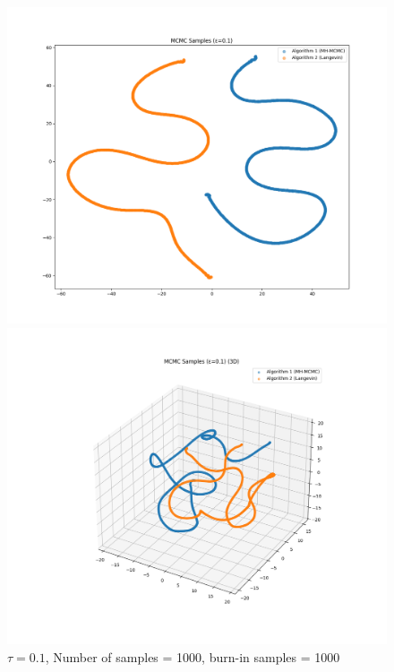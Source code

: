\documentclass[a4paper,12pt]{article}
\begin{document}
\begin{figure}[H]
  \centering
  \begin{minipage}{0.38\textwidth}
    \includegraphics[width=\linewidth]{TASK-0-1/images/samples_eps0.1_n1000_burn500_tsne_2d.png}
  \end{minipage}
  \hfill
  \begin{minipage}{0.38\textwidth}
    \includegraphics[width=\linewidth]{TASK-0-1/images/samples_eps0.1_n1000_burn1000_tsne_3d.png}
  \end{minipage}
  \caption{$\tau = 0.1$, Number of samples = 1000, burn-in samples = 1000}
\end{figure}
\end{document}
